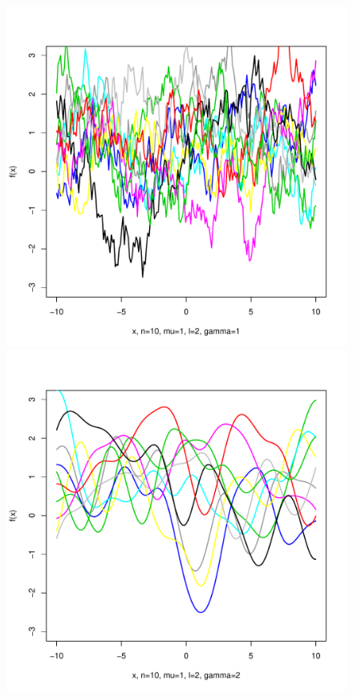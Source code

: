 \documentclass[12pt,letterpaper]{article}
\begin{document}
\begin{figure}
\begin{center}
\includegraphics[scale=0.2]{hw321/n10-m1-l2-g2.pdf}
\includegraphics[scale=0.2]{hw321/n10-m1-l2-g4.pdf}

\end{center}
\end{figure}
\end{document}

